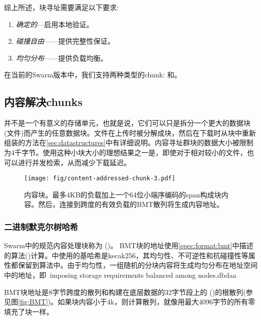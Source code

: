 综上所述，块寻址需要满足以下要求:

\begin{enumerate}
    \item \emph{确定的}—启用本地验证。
    \item \emph{碰撞自由}——提供完整性保证。
    \item \emph{均匀分布}——提供负载均衡。
\end{enumerate}

在当前的Swarm版本中，我们支持两种类型的chunk: 和。 

\subsection{内容解决chunks\statusgreen}\label{sec:content-addressed-chunks}

并不是一个有意义的存储单元，也就是说，它们可以只是拆分一个更大的数据块(文件)而产生的任意数据块。文件在上传时被分解成块，然后在下载时从块中重新组装的方法在\ref{sec:datastructures}中有详细说明。内容寻址群块的数据大小被限制为4千字节。使用这种小块大小的理想结果之一是，即使对于相对较小的文件，也可以进行并发检索，从而减少下载延迟。 

\begin{figure}[htbp]
   \centering
   \texttt{[image: fig/content-addressed-chunk-3.pdf]}
   \caption[内容解决chunk\statusgreen]{内容块。最多4KB的负载加上一个64位小端序编码的span构成块内容。然后，连接到跨度的有效负载的BMT散列将生成内容地址。}
   \label{fig:content-addressed-chunk}
\end{figure}

\subsubsection{二进制默克尔树哈希}

Swarm中的规范内容处理块称为 ()。
BMT块的地址使用\ref{spec:format:bmt}中描述的算法()计算。中使用的基哈希是kecak256，其均匀性、不可逆性和抗碰撞性等属性都保留到算法中。由于均匀性，一组随机的分块内容将生成均匀分布在地址空间中的地址，即\ imposing storage requirements balanced among nodes.dbdaa

BMT块地址是8字节跨度的散列和构建在底层数据的32字节段上的 ()的根散列(参见图\ref{fig:BMT})。如果块内容小于4k，则计算散列，就像用最大4096字节的所有零填充了块一样。

